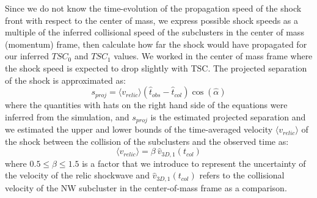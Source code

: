 Since we do not know the time-evolution of the propagation speed of the
shock front with respect to the center of mass, we express possible shock
speeds as a multiple of the inferred collisional speed of the subclusters
in the center of mass (momentum) frame, then calculate how far the shock would have propagated for our inferred
$TSC_0$ and $TSC_1$ values. We worked in the center of mass frame where the
shock speed is expected to drop slightly with TSC. 
The projected separation of the shock is approximated as:
\begin{equation}
	s_{proj} = \langle v_{relic} \rangle (\hat{t}_{obs} - \hat{t}_{col}) \cos(\hat{\alpha})
	\label{eqn: projectedsep}
\end{equation}
where the quantities with hats on the right hand side of the equations were
inferred from the simulation, and $s_{proj}$ is the estimated projected separation and we estimated the
upper and lower bounds of the time-averaged velocity
$\langle v_{relic} \rangle$ of the shock between
the collision of the subclusters and the observed time as:  
\begin{equation}
	\langle v_{relic} \rangle = \beta~\hat{v}_{3D,1}(t_{col})  
\end{equation}
where $0.5 \leq \beta \leq 1.5$ is a factor that we introduce to represent the
uncertainty of the velocity of the relic shockwave and $\hat{v}_{3D,1}(t_{col})$ refers to the collisional velocity of
the NW subcluster in the center-of-mass frame as a comparison. 
\label{sec: positionprior}


\par      

